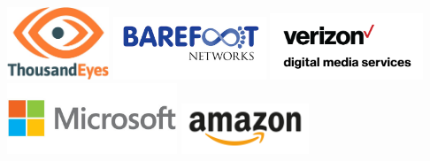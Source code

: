 \documentclass[sigconf]{acmart}
\begin{document}
\begin{center}
\includegraphics[width=1.2in]{thousand-eyes.jpg}
\hspace{0.2in}
\includegraphics[width=1.8in]{barefoot-networks.jpg}
\hspace{0.2in}
\includegraphics[width=1.8in]{verizon.png}
\hspace{0.2in}
\includegraphics[width=2in]{microsoft.jpg}
\hspace{0.2in}
\includegraphics[width=1.5in]{amazon.png}
\\[0.3cm]


\end{center}
\end{document}
